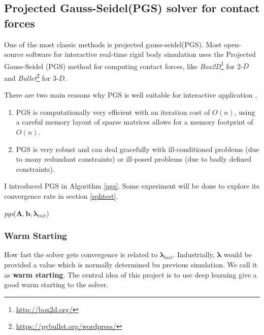     \subsection{Projected Gauss-Seidel(PGS) solver for contact forces}
    One of the most classic methods is projected gauss-seidel(PGS). Most open-source software for interactive real-time rigid body simulation uses the Projected Gauss-Seidel (PGS) method for computing contact forces, like \textit{Box2D}\footnote{\url{http://box2d.org/}} for 2-$D$ and \textit{Bullet}\footnote{\url{https://pybullet.org/wordpress/}} for 3-$D$. 

    There are two main reasons why PGS is well suitable for interactive application \cite{Erleben:2007:VSP:1243980.1243986}, 
    \begin{enumerate}
        \item PGS is computationally very efficient with an iteration cost of $O(n)$, using a careful memory layout of sparse matrices allows for a memory footprint of $O(n)$.
        \item PGS is very robust and can deal gracefully with ill-conditioned problems (due to many redundant constraints) or ill-posed problems (due to badly defined constraints).
    \end{enumerate}
    I introduced PGS in Algorithm \ref{pgs}. Some experiment will be done to explore its convergence rate in section \ref{sphtest}.
    \begin{algorithm}[!h]
        \caption{\textit{pgs}($\pmb{A}, \pmb{b}, \pmb{\lambda}_{init}$)}
        \label{pgs}
    \end{algorithm}
    \subsubsection{Warm Starting}
    How fast the solver gets convergence is related to $\pmb{\lambda}_{init}$. Industrially, $\pmb{\lambda}$ would be provided a value which is normally determined bu previous simulation. We call it as \textbf{warm starting}. The central idea of this project is to use deep learning give a good warm starting to the solver. 

